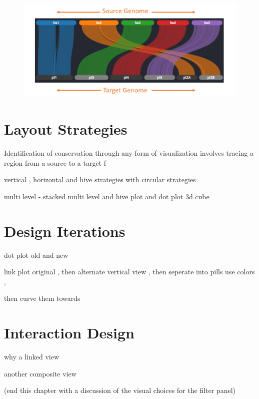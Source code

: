\begin{figure}
  \centering
  \includegraphics[width=.75\linewidth]{images/ch_4_genome_level.PNG}
  \label{fig:ch_4_genome_level}
\end{figure}



\section{Layout Strategies}

Identification of conservation through any form of visualization involves tracing a region from a source to a target f



vertical , horizontal and hive strategies with circular strategies

multi level - stacked multi level and hive plot and dot plot 3d cube 


\section{Design Iterations}

dot plot old and new 

link plot original , then alternate vertical view , 
then seperate into pills use colors ,

then curve them towards

\section{Interaction Design}

why a linked view

another composite view

(end this chapter with a discussion of the visual choices for the filter panel)
